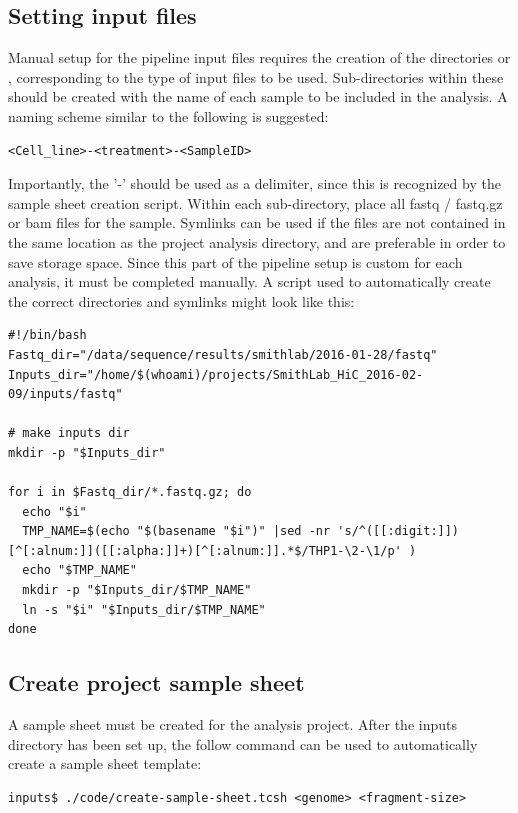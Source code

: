 \subsection{Setting input files}\label{Intro:setup-input-files}
Manual setup for the pipeline input files requires the creation of the directories  or , corresponding to the type of input files to be used. Sub-directories within these should be created with the name of each sample to be included in the analysis. A naming scheme similar to the following is suggested:
\begin{lstlisting}
<Cell_line>-<treatment>-<SampleID>
\end{lstlisting}
Importantly, the '-' should be used as a delimiter, since this is recognized by the sample sheet creation script. Within each sub-directory, place all fastq / fastq.gz or bam files for the sample. Symlinks can be used if the files are not contained in the same location as the project analysis directory, and are preferable in order to save storage space.  
Since this part of the pipeline setup is custom for each analysis, it must be completed manually. A script used to automatically create the correct directories and symlinks might look like this:


\begin{lstlisting}
#!/bin/bash
Fastq_dir="/data/sequence/results/smithlab/2016-01-28/fastq"
Inputs_dir="/home/$(whoami)/projects/SmithLab_HiC_2016-02-09/inputs/fastq"

# make inputs dir
mkdir -p "$Inputs_dir"

for i in $Fastq_dir/*.fastq.gz; do 
  echo "$i"
  TMP_NAME=$(echo "$(basename "$i")" |sed -nr 's/^([[:digit:]])[^[:alnum:]]([[:alpha:]]+)[^[:alnum:]].*$/THP1-\2-\1/p' )
  echo "$TMP_NAME"
  mkdir -p "$Inputs_dir/$TMP_NAME"
  ln -s "$i" "$Inputs_dir/$TMP_NAME"
done
\end{lstlisting}
 \subsection{Create project sample sheet}\label{Intro:setup-samplesheet}
 
A sample sheet must be created for the analysis project. After the inputs directory has been set up, the follow command can be used to automatically create a sample sheet template:
 
\begin{lstlisting}
inputs$ ./code/create-sample-sheet.tcsh <genome> <fragment-size>
\end{lstlisting}
 
